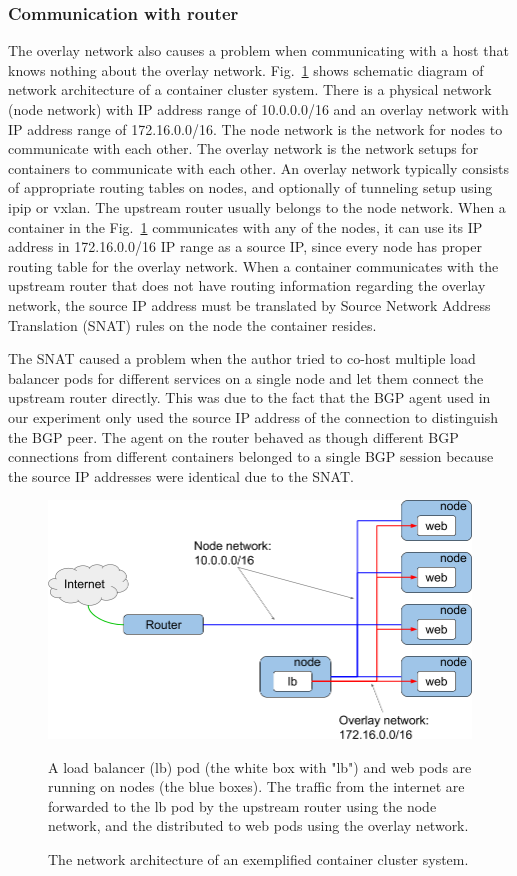 \subsubsection{Communication with router}

The overlay network also causes a problem when communicating with a host that knows nothing about the overlay network.
Fig.~\ref{fig:overlay} shows schematic diagram of network architecture of a container cluster system. 
There is a physical network (node network) with IP address range of 10.0.0.0/16 and an overlay network with IP address range of 172.16.0.0/16.
The node network is the network for nodes to communicate with each other.
The overlay network is the network setups for containers to communicate with each other.
An overlay network typically consists of appropriate routing tables on nodes, and optionally of tunneling setup using ipip or vxlan.
The upstream router usually belongs to the node network.
When a container in the Fig.~\ref{fig:overlay} communicates with any of the nodes, it can use its IP address in 172.16.0.0/16 IP range as a source IP, since every node has proper routing table for the overlay network.
When a container communicates with the upstream router that does not have routing information regarding the overlay network, the source IP address must be translated by Source Network Address Translation (SNAT) rules on the node the container resides.

The SNAT caused a problem when the author tried to co-host multiple load balancer pods for different services on a single node and let them connect the upstream router directly.
This was due to the fact that the BGP agent used in our experiment only used the source IP address of the connection to distinguish the BGP peer.
The agent on the router behaved as though different BGP connections from different containers belonged to a single BGP session because the source IP addresses were identical due to the SNAT.

\begin{figure}[h]
\centering
\includegraphics[width=0.8\columnwidth]{Figs/overlay.png}
\caption{The network architecture of an exemplified container cluster system. }

  A load balancer (lb) pod (the white box with "lb") and web pods are running on nodes (the blue boxes).
  The traffic from the internet are forwarded to the lb pod by the upstream router using the node network,
  and the distributed to web pods using the overlay network.

\label{fig:overlay}
\end{figure}

